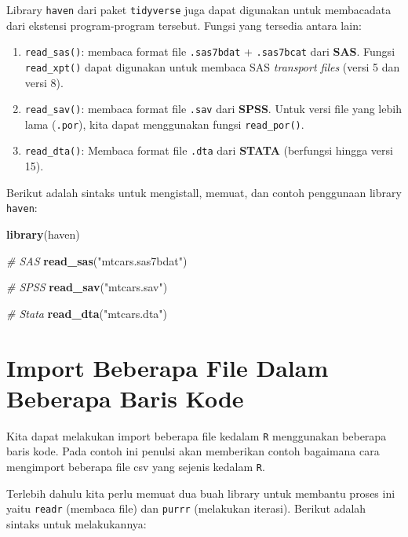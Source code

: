 \documentclass[]{book}
\newenvironment{Shaded}{\begin{snugshade}}{\end{snugshade}}
\newcommand{\KeywordTok}[1]{\textcolor[rgb]{0.13,0.29,0.53}{\textbf{#1}}}
\newcommand{\StringTok}[1]{\textcolor[rgb]{0.31,0.60,0.02}{#1}}
\newcommand{\CommentTok}[1]{\textcolor[rgb]{0.56,0.35,0.01}{\textit{#1}}}
\newcommand{\NormalTok}[1]{#1}
\providecommand{\tightlist}{%
  \setlength{\itemsep}{0pt}\setlength{\parskip}{0pt}}
\begin{document}
Library \texttt{haven} dari paket \texttt{tidyverse} juga dapat
digunakan untuk membacadata dari ekstensi program-program tersebut.
Fungsi yang tersedia antara lain:

\begin{enumerate}
\def\labelenumi{\arabic{enumi}.}
\tightlist
\item
  \texttt{read\_sas()}: membaca format file \texttt{.sas7bdat} +
  \texttt{.sas7bcat} dari \textbf{SAS}. Fungsi \texttt{read\_xpt()}
  dapat digunakan untuk membaca SAS \emph{transport files} (versi 5 dan
  versi 8).
\item
  \texttt{read\_sav()}: membaca format file \texttt{.sav} dari
  \textbf{SPSS}. Untuk versi file yang lebih lama (\texttt{.por}), kita
  dapat menggunakan fungsi \texttt{read\_por()}.
\item
  \texttt{read\_dta()}: Membaca format file \texttt{.dta} dari
  \textbf{STATA} (berfungsi hingga versi 15).
\end{enumerate}

Berikut adalah sintaks untuk mengistall, memuat, dan contoh penggunaan
library \texttt{haven}:

\begin{Shaded}
\begin{Highlighting}[]
\KeywordTok{library}\NormalTok{(haven)}

\CommentTok{# SAS}
\KeywordTok{read_sas}\NormalTok{(}\StringTok{"mtcars.sas7bdat"}\NormalTok{)}

\CommentTok{# SPSS}
\KeywordTok{read_sav}\NormalTok{(}\StringTok{"mtcars.sav"}\NormalTok{)}

\CommentTok{# Stata}
\KeywordTok{read_dta}\NormalTok{(}\StringTok{"mtcars.dta"}\NormalTok{)}
\end{Highlighting}
\end{Shaded}

\section{Import Beberapa File Dalam Beberapa Baris
Kode}\label{import-beberapa-file-dalam-beberapa-baris-kode}

Kita dapat melakukan import beberapa file kedalam \texttt{R} menggunakan
beberapa baris kode. Pada contoh ini penulsi akan memberikan contoh
bagaimana cara mengimport beberapa file csv yang sejenis kedalam
\texttt{R}.

Terlebih dahulu kita perlu memuat dua buah library untuk membantu proses
ini yaitu \texttt{readr} (membaca file) dan \texttt{purrr} (melakukan
iterasi). Berikut adalah sintaks untuk melakukannya:
\end{document}
